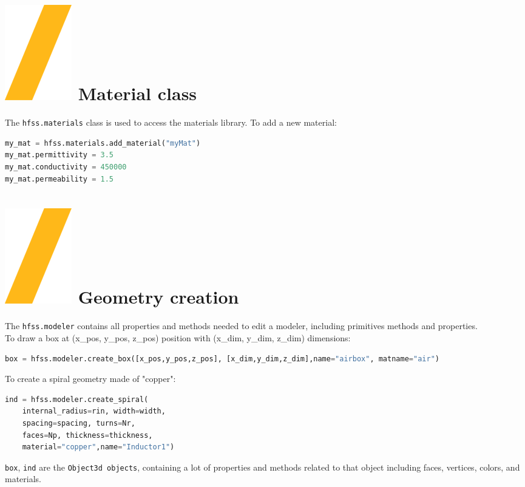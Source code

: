 \documentclass[9pt,landscape]{article}
\begin{document}
\begin{multicols}{3}
\section{\includegraphics[height=\fontcharht\font`\S]{slash.png} Material class}
The \texttt{hfss.materials} class is used to access the materials library.
\newline
To add a new material: 
\begin{lstlisting}[language=Python]
my_mat = hfss.materials.add_material("myMat")
my_mat.permittivity = 3.5
my_mat.conductivity = 450000
my_mat.permeability = 1.5
\end{lstlisting}

\section{\includegraphics[height=\fontcharht\font`\S]{slash.png} Geometry creation}
The \texttt{hfss.modeler} contains all properties and methods needed to edit a modeler, including primitives methods and properties.
\newline
\\
To draw a box at (x\_pos, y\_pos, z\_pos) position with (x\_dim, y\_dim, z\_dim) dimensions:
\begin{lstlisting}[language=Python]
box = hfss.modeler.create_box([x_pos,y_pos,z_pos], [x_dim,y_dim,z_dim],name="airbox", matname="air")
\end{lstlisting}
To create a spiral geometry made of "copper":
\begin{lstlisting}[language=Python]
ind = hfss.modeler.create_spiral(
	internal_radius=rin, width=width,
	spacing=spacing, turns=Nr,
	faces=Np, thickness=thickness,
	material="copper",name="Inductor1")
\end{lstlisting}
\columnbreak
\texttt{box}, \texttt{ind} are the \texttt{Object3d objects}, containing a lot of properties and methods related to that object including faces, vertices, colors, and materials.


\end{multicols}
\end{document}
